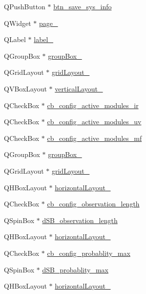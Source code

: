 \begin{DoxyCompactItemize}
Q\+Push\+Button $\ast$ \hyperlink{a00027_a5ccef61fb3372e70d59a662f4fde5db3}{btn\+\_\+save\+\_\+sys\+\_\+info}
\item 
Q\+Widget $\ast$ \hyperlink{a00027_a421261d29369be60b551aabe8b097597}{page\+\_}
\item 
Q\+Label $\ast$ \hyperlink{a00027_a13936e6f18b1c90402b3c7a3c92b6cdb}{label\+\_}
\item 
Q\+Group\+Box $\ast$ \hyperlink{a00027_a1a1fe5ec77ba52ba39a16db29ff0f91a}{group\+Box\+\_}
\item 
Q\+Grid\+Layout $\ast$ \hyperlink{a00027_ad113cf7b76aaf178473555bdf64ff035}{grid\+Layout\+\_}
\item 
Q\+V\+Box\+Layout $\ast$ \hyperlink{a00027_a7b66d5d6ab55f3977317359d09a42345}{vertical\+Layout\+\_}
\item 
Q\+Check\+Box $\ast$ \hyperlink{a00027_abef4ef3d5d03026de5d5e172eb0335a6}{cb\+\_\+config\+\_\+active\+\_\+modules\+\_\+ir}
\item 
Q\+Check\+Box $\ast$ \hyperlink{a00027_a72ad8a6b100948f9b1438cf3b949be5e}{cb\+\_\+config\+\_\+active\+\_\+modules\+\_\+uv}
\item 
Q\+Check\+Box $\ast$ \hyperlink{a00027_abc96d02b5b7a9480a2a142008e99a100}{cb\+\_\+config\+\_\+active\+\_\+modules\+\_\+mf}
\item 
Q\+Group\+Box $\ast$ \hyperlink{a00027_ab492988d340548c7f30e098419ef10ee}{group\+Box\+\_}
\item 
Q\+Grid\+Layout $\ast$ \hyperlink{a00027_a79b264e6945e3b94a511427b1c270dd7}{grid\+Layout\+\_}
\item 
Q\+H\+Box\+Layout $\ast$ \hyperlink{a00027_ad81454913b05646674b1a41c595b8510}{horizontal\+Layout\+\_}
\item 
Q\+Check\+Box $\ast$ \hyperlink{a00027_ae9e8f3f0d147a4cd21c8f36ffb3bd81f}{cb\+\_\+config\+\_\+observation\+\_\+length}
\item 
Q\+Spin\+Box $\ast$ \hyperlink{a00027_a1fe1bf902f2a365c4c94612d2a2ffbcc}{d\+S\+B\+\_\+observation\+\_\+length}
\item 
Q\+H\+Box\+Layout $\ast$ \hyperlink{a00027_a3b24c4bb360d79ae2e886fe63c8fdac7}{horizontal\+Layout\+\_}
\item 
Q\+Check\+Box $\ast$ \hyperlink{a00027_ad0a7ea02564c112595f0d30efa75eef2}{cb\+\_\+config\+\_\+probablity\+\_\+max}
\item 
Q\+Spin\+Box $\ast$ \hyperlink{a00027_a137b79e810736643ac4b15e221909871}{d\+S\+B\+\_\+probablity\+\_\+max}
\item 
Q\+H\+Box\+Layout $\ast$ \hyperlink{a00027_aa53955f35b7d9f3d161525ed8639db84}{horizontal\+Layout\+\_}

\end{DoxyCompactItemize}
